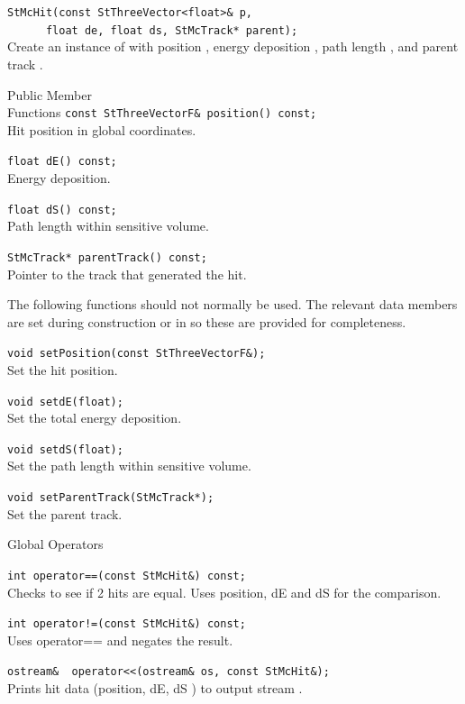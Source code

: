 \begin{Entry}
    \verb+StMcHit(const StThreeVector<float>& p,+\\
    \verb+      float de, float ds, StMcTrack* parent);+\\
    
    Create an instance of  with position ,
    energy deposition , path length , and parent track .

\item[Public Member\\ Functions]
    \verb+const StThreeVectorF& position() const;+\\
    Hit position in global coordinates.

    \verb+float dE() const;+\\
    Energy deposition.

    \verb+float dS() const;+\\
    Path length within sensitive volume.

    \verb+StMcTrack* parentTrack() const;+\\
    Pointer to the track that generated the hit.

    The following functions should not normally be used.
    The relevant data members are set during construction or
    in  so these are provided for completeness.

    \verb+void setPosition(const StThreeVectorF&);+\\
    Set the hit position.

    \verb+void setdE(float);+\\
    Set the total energy deposition.

    \verb+void setdS(float);+\\
    Set the path length within sensitive volume.

    \verb+void setParentTrack(StMcTrack*);+\\
    Set the parent track.
    
\item[Global Operators]

    \verb+int operator==(const StMcHit&) const;+\\
    Checks to see if 2 hits are equal.  Uses position, dE and dS
    for the comparison.

    \verb+int operator!=(const StMcHit&) const;+\\
    Uses operator== and negates the result.

    \verb+ostream&  operator<<(ostream& os, const StMcHit&);+\\
    Prints hit data (position, dE, dS ) to output stream .


\end{Entry}
